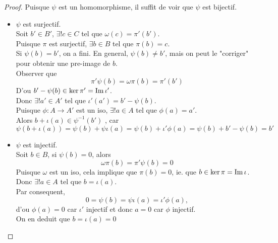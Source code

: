 \documentclass[../main.tex]{subfiles}
\begin{document}
\begin{proof}
Puisque $\psi$ est un homomorphisme, il suffit de voir que $\psi$ est bijectif.\\
\begin{itemize}
\item $\psi$ est surjectif.\\
	Soit $b'\in B'$, $\exists! c\in C$ tel que $\omega( c) = \pi'( b') $.\\
	Puisque $\pi$ est surjectif, $\exists b \in B$ tel que $\pi( b) = c$.\\
	Si $\psi( b) =b'$, on a fini. En general, $\psi( b) \neq b'$, mais on peut le "corriger" pour obtenir une pre-image de $b$.\\
	Observer que
	\[ 
	\pi'\psi( b) =\omega\pi( b) =\pi'( b') 
	\]
D'ou $b'- \psi( b) \in \ker\pi' = \operatorname{Im}\iota'$.\\
Donc $\exists! a' \in A' $ tel que $\iota'( a') = b' - \psi( b) $.\\
Puisque $\phi: A \to A'$ est un iso, $\exists! a \in A$ tel que $\phi( a) = a'$.\\
Alors $b+ \iota( a) \in \psi^{-1}( b')$ , car
\[ 
\psi( b+ \iota( a) ) = \psi( b) + \psi\iota( a) = \psi( b) + \iota'\phi( a) = \psi( b) + b'- \psi( b) = b'
\]
\item $\psi$ est injectif.\\
	Soit $b \in B$, si $\psi( b) =0$, alors 
\[ 
\omega\pi( b) = \pi'\psi( b) = 0
\]
Puisque $\omega$ est un iso, cela implique que $\pi( b) =0$, ie. que $b \in \ker\pi = \operatorname{Im}\iota$.\\
Donc $\exists! a \in A$ tel que $b = \iota( a) $.\\
Par consequent,
\[ 
0 = \psi( b) = \psi\iota( a) = \iota'\phi( a),
\]
d'ou $\phi( a) = 0$ car $\iota'$ injectif et donc $a= 0$ car $\phi$ injectif.\\
On en deduit que $b = \iota( a) =0$ 
\end{itemize}

\end{proof}
\end{document}
